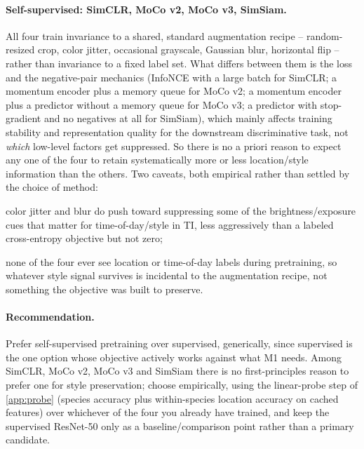 \paragraph{Self-supervised: SimCLR, MoCo v2, MoCo v3, SimSiam.}
All four train invariance to a shared, standard augmentation recipe -- random-resized crop, color
jitter, occasional grayscale, Gaussian blur, horizontal flip -- rather than invariance to a fixed
label set. What differs between them is the loss and the negative-pair mechanics (InfoNCE with a
large batch for SimCLR; a momentum encoder plus a memory queue for MoCo v2; a momentum encoder plus 
a predictor without a memory queue for MoCo v3; a predictor with stop-gradient and no negatives at 
all for SimSiam), which mainly affects training stability and representation quality for the 
downstream discriminative task, not \emph{which} low-level factors get suppressed. So there is no a 
priori reason to expect any one of the four to retain systematically more or less location/style 
information than the others. Two caveats, both empirical rather than settled by the choice of 
method: 
\begin{enumerate*}[label=(\alph*)]
\item color jitter and blur do push toward suppressing some of the brightness/exposure cues that 
matter for time-of-day/style in TI, less aggressively than a labeled cross-entropy objective but not 
zero; 
\item none of the four ever see location or time-of-day labels during pretraining, so whatever style 
signal survives is incidental to the augmentation recipe, not something the objective was built to 
preserve.
\end{enumerate*}
\paragraph{Recommendation.}
Prefer self-supervised pretraining over supervised, generically, since supervised is the one option
whose objective actively works against what M1 needs. Among SimCLR, MoCo v2, MoCo v3 and SimSiam
there is no first-principles reason to prefer one for style preservation; choose empirically, using
the linear-probe step of \cref{app:probe} (species accuracy plus within-species location accuracy on
cached features) over whichever of the four you already have trained, and keep the supervised
ResNet-50 only as a baseline/comparison point rather than a primary candidate.

